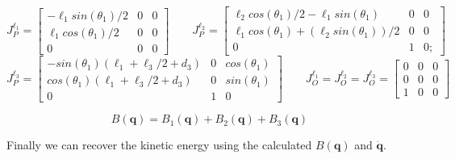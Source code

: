 \documentclass[a4paper,12pt]{article}
\renewcommand*{\l}{\ell}
\begin{document}
\[
    J^{\l_1}_{P} = \begin{bmatrix}
        -\l_1sin(\theta_1)/2 & 0 & 0 \\
 \l_1cos(\theta_1)/2 &0 &0 \\
               0 &0 &0
    \end{bmatrix}
    \qquad
    J^{\l_2}_{P} = \begin{bmatrix}
        \l_2cos(\theta_1)/2 - \l_1sin(\theta_1) &0 &0\\
\l_1cos(\theta_1) + (\l_2sin(\theta_1))/2& 0 &0\\
                            0& 1& 0;
    \end{bmatrix}
\]
\[
    J^{\l_3}_{P} = \begin{bmatrix}
        -sin(\theta_1)(\l_1 + \l_3/2 + d_3) &0 & cos(\theta_1)\\
 cos(\theta_1)(\l_1 + \l_3/2 + d_3) &0 &sin(\theta_1)\\
                          0 &1 &      0
    \end{bmatrix}
    \qquad
    J^{\l_1}_{O} = J^{\l_2}_{O} = J^{\l_3}_{O} =\begin{bmatrix}
        0 &0 &0\\ 0& 0 &0\\ 1& 0& 0
    \end{bmatrix}
\]

\[
  B(\textbf{q}) = B_1(\textbf{q}) + B_2(\textbf{q}) +B_3(\textbf{q}) 
\]

\noindent Finally we can recover the kinetic energy using the calculated $B(\textbf{q})$ and $ \dot{\textbf{q}}$.
\end{document}
